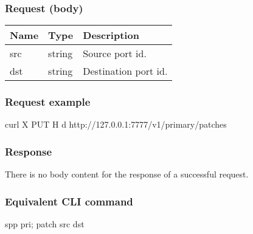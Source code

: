 \documentclass[a4paper,11pt,openany,oneside,english]{sphinxmanual}
\begin{document}
\subsubsection{Request (body)}
\label{\detokenize{api_ref/spp_primary:id8}}

\begin{savenotes}\sphinxattablestart
\centering
{}
\sphinxthecaptionisattop
{}\label{\detokenize{api_ref/spp_primary:id25}}\label{\detokenize{api_ref/spp_primary:table-spp-ctl-spp-primary-ports-patches-body}}
\sphinxaftertopcaption
\begin{tabulary}{\linewidth}[t]{|T|T|T|}
\hline
\sphinxstyletheadfamily 
Name
&\sphinxstyletheadfamily 
Type
&\sphinxstyletheadfamily 
Description
\\
\hline
src
&
string
&
Source port id.
\\
\hline
dst
&
string
&
Destination port id.
\\
\hline
\end{tabulary}
\par
\sphinxattableend\end{savenotes}


\subsubsection{Request example}
\label{\detokenize{api_ref/spp_primary:id9}}
\begin{sphinxVerbatim}[commandchars=\\\{\},formatcom=\footnotesize]
 curl \PYGZhy{}X PUT \PYGZhy{}H  
  \PYGZhy{}d  
  http://127.0.0.1:7777/v1/primary/patches
\end{sphinxVerbatim}


\subsubsection{Response}
\label{\detokenize{api_ref/spp_primary:id10}}
There is no body content for the response of a successful  request.


\subsubsection{Equivalent CLI command}
\label{\detokenize{api_ref/spp_primary:id11}}
\begin{sphinxVerbatim}[commandchars=\\\{\},formatcom=\footnotesize]
spp \PYGZgt{} pri; patch \PYGZob{}src\PYGZcb{} \PYGZob{}dst\PYGZcb{}
\end{sphinxVerbatim}
\end{document}
